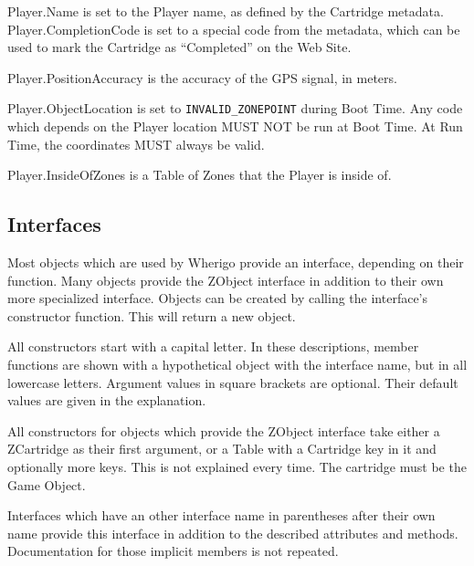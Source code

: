 \documentclass{article}
\begin{document}
Player.Name is set to the Player name, as defined by the Cartridge metadata.
Player.CompletionCode is set to a special code from the metadata, which can be
used to mark the Cartridge as ``Completed'' on the Web Site.

Player.PositionAccuracy is the accuracy of the GPS signal, in meters.

Player.ObjectLocation is set to \verb-INVALID_ZONEPOINT- during Boot Time.
Any code which depends on the Player location MUST NOT be run at Boot Time.
At Run Time, the coordinates MUST always be valid.

Player.InsideOfZones is a Table of Zones that the Player is inside of.

\subsection{Interfaces}
Most objects which are used by Wherigo provide an interface, depending on their
function.  Many objects provide the ZObject interface in addition to their own
more specialized interface.  Objects can be created by calling the interface's
constructor function.  This will return a new object.

All constructors start with a capital letter. In these descriptions, member
functions are shown with a hypothetical object with the interface name, but in
all lowercase letters. Argument values in square brackets are optional. Their
default values are given in the explanation.

All constructors for objects which provide the ZObject interface take either a
ZCartridge as their first argument, or a Table with a Cartridge key in it and
optionally more keys. This is not explained every time. The cartridge must be
the Game Object.

Interfaces which have an other interface name in parentheses after their own
name provide this interface in addition to the described attributes and
methods.  Documentation for those implicit members is not repeated.
\end{document}
